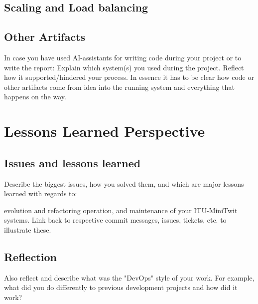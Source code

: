 \documentclass{article}
\begin{document}
\subsection{Scaling and Load balancing}


\subsection{Other Artifacts}
In case you have used AI-assistants for writing code during your project or to write the report:
Explain which system(s) you used during the project.
Reflect how it supported/hindered your process.
In essence it has to be clear how code or other artifacts come from idea into the running system and everything that happens on the way.


\section{Lessons Learned Perspective}

\subsection{Issues and lessons learned}
Describe the biggest issues, how you solved them, and which are major lessons learned with regards to:

evolution and refactoring operation, and maintenance of your ITU-MiniTwit systems. Link back to respective commit messages, issues, tickets, etc. to illustrate these.
\subsection{Reflection}

Also reflect and describe what was the "DevOps" style of your work. For example, what did you do differently to previous development projects and how did it work?
\end{document}
